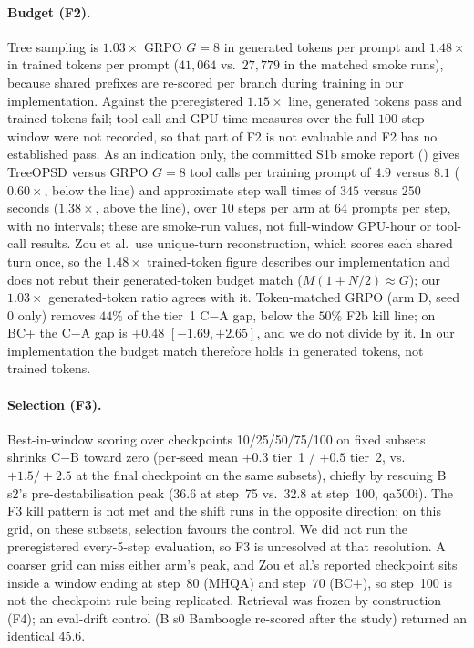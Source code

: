 \documentclass[11pt]{article}
\begin{document}
\paragraph{Budget (F2).} Tree sampling is $1.03\times$ GRPO $G{=}8$ in
generated tokens per prompt and $1.48\times$ in trained tokens per prompt
($41{,}064$ vs.\ $27{,}779$ in the matched smoke runs), because shared
prefixes are re-scored per branch during training in our implementation.
Against the preregistered $1.15\times$ line, generated tokens pass and
trained tokens fail; tool-call and GPU-time measures over the full $100$-step window were
not recorded, so that part of F2 is not evaluable and F2 has no established
pass. As an indication only, the committed S1b smoke report
()
gives TreeOPSD versus GRPO $G{=}8$ tool calls per training prompt of
$4.9$ versus $8.1$ ($0.60\times$, below the line) and approximate step
wall times of $345$ versus $250$ seconds ($1.38\times$, above the line),
over $10$ steps per arm at $64$ prompts per step, with no intervals;
these are smoke-run values, not full-window GPU-hour or tool-call results.
Zou et al.\ use unique-turn reconstruction, which scores each shared
turn once, so the $1.48\times$ trained-token figure describes our
implementation and does not rebut their generated-token budget match
($M(1+N/2)\approx G$); our $1.03\times$ generated-token ratio agrees with
it. Token-matched GRPO (arm D, seed 0 only) removes $44\%$ of the tier~1
C$-$A gap, below the $50\%$ F2b kill line; on BC+ the C$-$A gap is $+0.48$
$[-1.69, +2.65]$, and we do not divide by it. In our implementation the
budget match therefore holds in generated tokens, not trained tokens.

\paragraph{Selection (F3).} Best-in-window scoring over checkpoints
10/25/50/75/100 on fixed subsets shrinks C$-$B toward zero (per-seed mean
$+0.3$ tier~1 / $+0.5$ tier~2, vs.\ $+1.5/+2.5$ at the final checkpoint
on the same subsets), chiefly by rescuing B s2's pre-destabilisation peak
($36.6$ at step~75 vs.\ $32.8$ at step~100, qa500i). The F3 kill pattern
is not met and the shift runs in the opposite direction; on this grid,
on these subsets, selection favours the control. We did not run the
preregistered every-5-step evaluation, so F3 is unresolved at that
resolution. A coarser grid can miss either arm's peak, and Zou et al.'s
reported checkpoint sits inside a window ending at step~80 (MHQA) and
step~70 (BC+), so step~100 is not the checkpoint rule being replicated.
Retrieval was
frozen by construction (F4); an eval-drift control (B s0 Bamboogle
re-scored after the study) returned an identical $45.6$.
\end{document}
